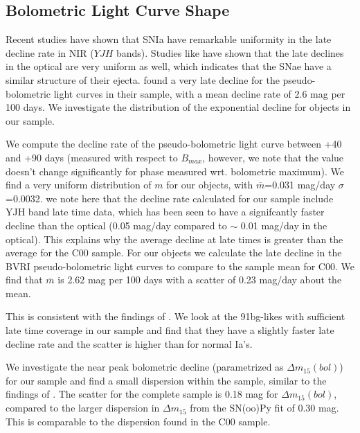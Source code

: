 \subsection{Bolometric Light Curve Shape}
Recent studies have shown that SNIa have remarkable uniformity in the late decline rate in NIR ($YJH$ bands). Studies like \citep{Barbon1973, Phillips1999, Leibundgut2000}
have shown that the late declines in the optical are very uniform as well, which indicates that the SNae have a similar structure of their ejecta. \citet{Contardo2000}
found a very late decline for the pseudo-bolometric light curves in their sample, with a mean decline rate of 2.6 mag per 100 days. We investigate the distribution of the exponential 
decline for objects in our sample.

We compute the decline rate of the pseudo-bolometric light curve between +40 and +90 days (measured with respect to $B_{max}$, however, we note that the value doesn't change significantly for phase
measured wrt. bolometric maximum). We find a very uniform distribution of $m$ for our objects, with $\overline{m}$=0.031 mag/day $\sigma$=0.0032. we note here that the decline rate calculated for our sample include YJH band late time data, which has been seen to have a signifcantly faster decline than the optical (0.05 mag/day compared to $\sim$ 0.01 mag/day in the optical). This explains why the average decline at late times is greater than the average for the C00 sample. 
For our objects we calculate the late decline in the BVRI pseudo-bolometric light curves to compare to the sample mean for C00. We find that $\overline{m}$ is 2.62 mag per 100 days with a scatter of 0.23 mag/day about the mean.   

This is consistent with the findings of \citet{Contardo2000}.
We look at the 91bg-likes with sufficient late time coverage in our sample and find that they have a slightly faster late decline rate and the scatter is higher than for normal Ia's. 


We investigate the near peak bolometric decline (parametrized as $\Delta m_{15}(bol)$) for our sample and find a small dispersion within the sample, similar to the findings of \citet{Contardo2000}.
The scatter for the complete sample is 0.18 mag for $\Delta m_{15}(bol)$, compared to the larger dispersion in $\Delta m_{15}$ from the SN(oo)Py fit of 0.30 mag. This is comparable to the dispersion found in the C00 sample.

